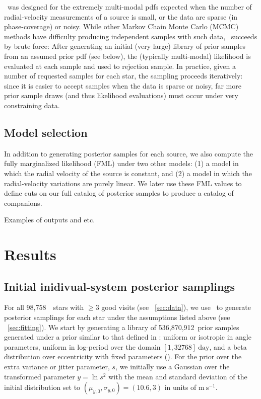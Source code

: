 \documentclass[modern, letterpaper]{aastex62}
\newcommand{\apogee}{\project{\acronym{APOGEE}}}
\newcommand{\thejoker}{\project{The~Joker}}
\newcommand{\nprior}{536,870,912}
\newcommand{\nstars}{98,758}
\begin{document}
\thejoker\ was designed for the extremely multi-modal pdfs expected when the
number of radial-velocity measurements of a source is small, or the data are
sparse (in phase-coverage) or noisy.
While other Markov Chain Monte Carlo (MCMC) methods have difficulty producing
independent samples with such data, \thejoker\ succeeds by brute force:
After generating an initial (very large) library of prior samples from an
assumed prior pdf (see below), the (typically multi-modal) likelihood is
evaluated at each sample and used to rejection sample.
In practice, given a number of requested samples for each star, the sampling
proceeds iteratively: since it is easier to accept samples when the data is
sparse or noisy, far more prior sample draws (and thus likelihood evaluations)
must occur under very constraining data.

\subsection{Model selection}

In addition to generating posterior samples for each source, we also compute the
fully marginalized likelihood (FML) under two other models: (1) a model in which
the radial velocity of the source is constant, and (2) a model in which the
radial-velocity variations are purely linear.
We later use these FML values to define cuts on our full catalog of posterior
samples to produce a catalog of companions.


Examples of outputs and etc.

\section{Results}

\subsection{Initial inidivual-system posterior samplings}
\label{sec:initsampling}

For all \nstars\ \apogee\ stars with $\geq 3$ good visits (see
\sectionname~\ref{sec:data}), we use \thejoker\ to generate posterior samplings
for each star under the assumptions listed above (see
\sectionname~\ref{sec:fitting}).
We start by generating a library of \nprior\ prior samples generated under a
prior similar to that defined in \citet{Price-Whelan:2017}: uniform or isotropic
in angle parameters, uniform in log-period over the domain $[1,
32768]~\textrm{day}$, and a beta distribution over eccentricity with fixed
parameters (\citealt{Kipping:2013}).
For the prior over the extra variance or jitter parameter, $s$, we initially use
a Gaussian over the transformed parameter $y = \ln s^2$ with the mean and
standard deviation of the initial distribution set to $(\mu_{y,0}, \sigma_{y,0})
= (10.6, 3)$ in units of $\textrm{m}~\textrm{s}^{-1}$.
\end{document}
